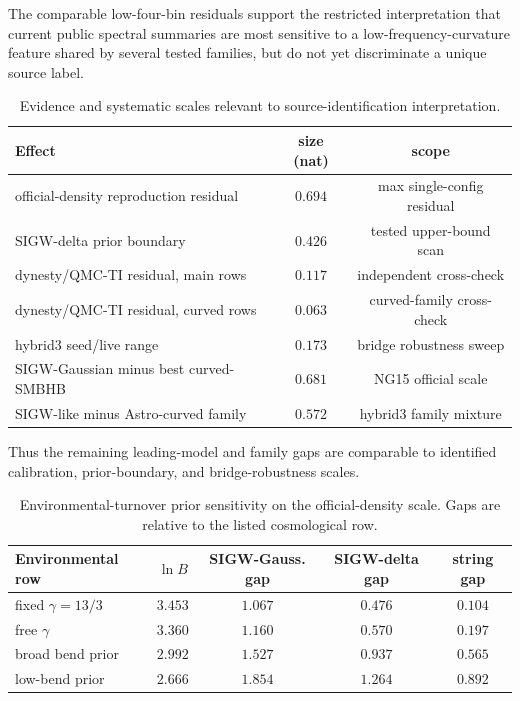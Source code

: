 \documentclass[aps,prl,superscriptaddress,nofootinbib]{revtex4-2}
\begin{document}
The comparable low-four-bin residuals support the restricted interpretation
that current public spectral summaries are most sensitive to a
low-frequency-curvature feature shared by several tested families, but do not
yet discriminate a unique source label.

\begin{table}[H]
\caption{\label{tab:final-budget}Evidence and systematic scales relevant to
source-identification interpretation.}
\begin{ruledtabular}
\begin{tabular}{lcc}
Effect & size (nat) & scope \\
\hline
official-density reproduction residual & $0.694$ & max single-config residual \\
SIGW-delta prior boundary & $0.426$ & tested upper-bound scan \\
dynesty/QMC-TI residual, main rows & $0.117$ & independent cross-check \\
dynesty/QMC-TI residual, curved rows & $0.063$ & curved-family cross-check \\
hybrid3 seed/live range & $0.173$ & bridge robustness sweep \\
SIGW-Gaussian minus best curved-SMBHB & $0.681$ & NG15 official scale \\
SIGW-like minus Astro-curved family & $0.572$ & hybrid3 family mixture \\
\end{tabular}
\end{ruledtabular}
\end{table}

Thus the remaining leading-model and family gaps are comparable to identified
calibration, prior-boundary, and bridge-robustness scales.

\begin{table}[H]
\caption{\label{tab:env-prior-final}Environmental-turnover prior sensitivity on
the official-density scale.  Gaps are relative to the listed cosmological row.}
\begin{ruledtabular}
\begin{tabular}{lcccc}
Environmental row & $\ln B$ & SIGW-Gauss. gap & SIGW-delta gap & string gap \\
\hline
fixed $\gamma=13/3$ & $3.453$ & $1.067$ & $0.476$ & $0.104$ \\
free $\gamma$ & $3.360$ & $1.160$ & $0.570$ & $0.197$ \\
broad bend prior & $2.992$ & $1.527$ & $0.937$ & $0.565$ \\
low-bend prior & $2.666$ & $1.854$ & $1.264$ & $0.892$ \\
\end{tabular}
\end{ruledtabular}
\end{table}
\end{document}
